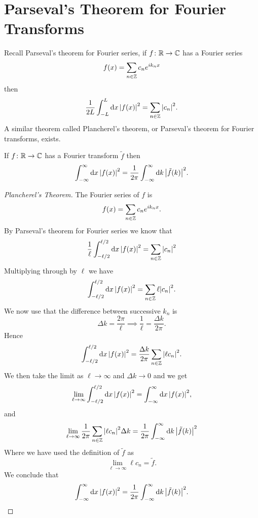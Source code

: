 \documentclass[a4paper]{article}
\begin{document}
    \section{Parseval's Theorem for Fourier Transforms}
    Recall Parseval's theorem for Fourier series, if \(f\colon\mathbb{R}\to\mathbb{C}\) has a Fourier series
    \[f(x) = \sum_{n\in\mathbb{Z}}c_ne^{ik_nx}\]
    then
    \[\frac{1}{2L}\int_{-L}^{L} \dd{x} \abs{f(x)}^2 = \sum_{n\in\mathbb{Z}} \abs{c_n}^2.\]
    A similar theorem called Plancherel's theorem, or Parseval's theorem for Fourier transforms, exists.
    \begin{theorem}
        If \(f\colon\mathbb{R}\to\mathbb{C}\) has a Fourier transform \(\tilde{f}\) then
        \[\int_{-\infty}^{\infty} \dd{x} \abs{f(x)}^2 = \frac{1}{2\pi} \int_{-\infty}^{\infty} \dd{k} \abs{\tilde{f}(k)}^2.\]
    \end{theorem}
    \begin{proof}[Plancherel's Theorem]
        The Fourier series of \(f\) is
        \[f(x) = \sum_{n\in\mathbb{Z}} c_ne^{ik_nx}.\]
        By Parseval's theorem for Fourier series we know that
        \[\frac{1}{\ell}\int_{-\ell/2}^{\ell/2}\dd{x}\abs{f(x)}^2 = \sum_{n\in\mathbb{Z}}\abs{c_n}^2\]
        Multiplying through by \(\ell\) we have
        \[\int_{-\ell/2}^{\ell/2} \dd{x} \abs{f(x)}^2 = \sum_{n\in\mathbb{Z}} \ell\abs{c_n}^2.\]
        We now use that the difference between successive \(k_n\) is
        \[\Delta k = \frac{2\pi}{\ell} \implies \frac{1}{\ell} = \frac{\Delta k}{2\pi}.\]
        Hence
        \[\int_{-\ell/2}^{\ell/2} \dd{x} \abs{f(x)}^2 = \frac{\Delta k}{2\pi}\sum_{n\in\mathbb{Z}} \abs{\ell c_n}^2.\]
        We then take the limit as \(\ell \to\infty\) and \(\Delta k \to 0\) and we get
        \[\lim_{\ell \to \infty} \int_{-\ell/2}^{\ell/2} \dd{x} \abs{f(x)}^2 = \int_{-\infty}^{\infty} \dd{x} \abs{f(x)}^2,\]
        and
        \[\lim_{\ell \to \infty} \frac{1}{2\pi}\sum_{n\in\mathbb{Z}} \abs{\ell c_n}^2\Delta k = \frac{1}{2\pi} \int_{-\infty}^{\infty} \dd{k} \abs{\tilde{f}(k)}^2\]
        Where we have used the definition of \(\tilde{f}\) as
        \[\lim_{\ell\to\infty} \ell c_n = \tilde{f}.\]
        We conclude that
        \[\int_{-\infty}^{\infty} \dd{x} \abs{f(x)}^2 = \frac{1}{2\pi} \int_{-\infty}^{\infty} \dd{k} \abs{\tilde{f}(k)}^2.\]
    \end{proof}
\end{document}
